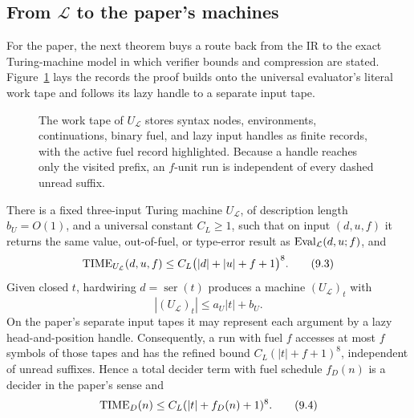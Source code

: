 \subsection{From \texorpdfstring{\(\mathcal L\)}{L} to the paper's machines}

For the paper, the next theorem buys a route back from the IR to the exact
Turing-machine model in which verifier bounds and compression are stated.
Figure~\ref{fig:u-l-heap} lays the records the proof builds onto the universal
evaluator's literal work tape and follows its lazy handle to a separate input
tape.
\begin{figure}[H]
\centering

\caption{The work tape of \(U_{\mathcal L}\) stores syntax nodes, environments, continuations, binary fuel, and lazy input handles as finite records, with the active fuel record highlighted.  Because a handle reaches only the visited prefix, an \(f\)-unit run is independent of every dashed unread suffix.}
\label{fig:u-l-heap}
\end{figure}

\begin{theorem}
\label{thm:l-to-tm}\enspace%
There is a fixed three-input Turing machine \(U_{\mathcal L}\), of description
length \(b_U=O(1)\), and a universal constant \(C_L\geq1\), such that on input
\((d,u,f)\) it returns the same value, out-of-fuel, or type-error result as
\(\operatorname{Eval}_{\mathcal L}(d,u;f)\), and
\[
 \operatorname{TIME}_{U_{\mathcal L}}(d,u,f)
 \leq C_L\bigl(|d|+|u|+f+1\bigr)^8.
\tag{9.3}\label{eq:l-to-tm-bound}
\]
Given closed \(t\), hardwiring \(d=\operatorname{ser}(t)\) produces a machine
\((U_{\mathcal L})_t\) with
\[
 |(U_{\mathcal L})_t|\leq a_U|t|+b_U.
\]
On the paper's separate input tapes it may represent each argument by a lazy
head-and-position handle.  Consequently, a run with fuel \(f\) accesses at
most \(f\) symbols of those tapes and has the refined bound
\(C_L(|t|+f+1)^8\), independent of unread suffixes.  Hence a total decider term
with fuel schedule \(f_D(n)\) is a decider in the paper's sense and
\[
 \operatorname{TIME}_D(n)\leq C_L(|t|+f_D(n)+1)^8.
\tag{9.4}\label{eq:decider-term-time}
\]
\end{theorem}

